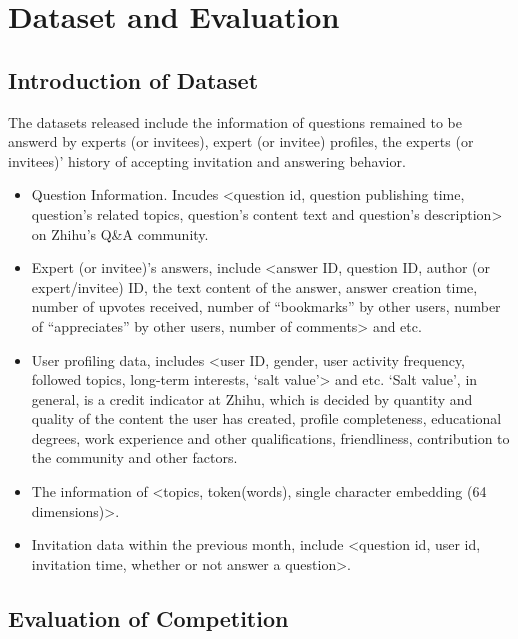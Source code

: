 \documentclass[sigconf]{acmart}
\begin{document}
\section{Dataset and Evaluation}

\subsection{Introduction of Dataset}

 The datasets released include the information of questions remained to be answerd by experts (or invitees), expert (or invitee) profiles, the experts (or invitees)’ history of accepting invitation and answering behavior.

 
\begin{itemize}
\item Question Information. Incudes <question id, question publishing time, question’s related topics, question’s content text and question’s description> on Zhihu’s Q\&A community.

 

\item Expert (or invitee)’s answers, include <answer ID, question ID, author (or expert/invitee) ID, the text content of the answer, answer creation time, number of upvotes received, number of “bookmarks” by other users, number of “appreciates” by other users, number of comments> and etc.

 

\item User profiling data, includes <user ID, gender, user activity frequency, followed topics, long-term interests, ‘salt value’> and etc. ‘Salt value’, in general, is a credit indicator at Zhihu, which is decided by quantity and quality of the content the user has created, profile completeness, educational degrees, work experience and other qualifications, friendliness, contribution to the community and other factors.

 

\item The information of <topics, token(words), single character embedding (64 dimensions)>.

 

\item Invitation data within the previous month, include <question id, user id, invitation time, whether or not answer a question>.

\end{itemize}

\subsection{Evaluation of Competition}
\end{document}
